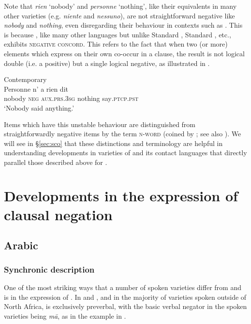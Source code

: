 \documentclass[output=paper]{langsci/langscibook}
\begin{document}
Note that  \textit{rien} ‘nobody’ and \textit{personne} ‘nothing’, like their equivalents in many other  varieties (e.g.  \textit{niente} and \textit{nessuno}), are not straightforward negative  like  \textit{nobody} and \textit{nothing}, even disregarding their behaviour in contexts such as . This is because , like many other languages but unlike {Standard} , {Standard} ,  etc., exhibits \textsc{negative} \textsc{concord}. This refers to the fact that when two (or more) elements which express  on their own co-occur in a clause, the result is not logical double  (i.e. a positive) but a single logical negative, as illustrated in .

\ea\label{cont2}
{       Contemporary  \citep[69]{Hansen2013}} \\
\gll Personne n’ a rien dit\\
     nobody \textsc{neg} \textsc{aux}.\textsc{prs.3sg} nothing say\textsc{.ptcp.pst}\\
\glt ‘Nobody said anything.’
\z

Items which have this unstable behaviour are distinguished from straightforwardly negative items by the term \textsc{n-word} (coined by \citealt{Laka1990}; see also \citealt{Giannakidou2006}). We will see in §\ref{sec:sco} that these distinctions and terminology are helpful in understanding developments in varieties of  and its contact languages that directly parallel those described above for .


\section{Developments in the expression of clausal negation}\label{sec:dev}


\subsection{Arabic}





\subsubsection{Synchronic description}



One of the most striking ways that a number of spoken  varieties differ from  and   is in the expression of . In  and  , and in the majority of varieties spoken outside of North Africa,  is exclusively preverbal, with the basic verbal negator in the spoken varieties being \textit{mā}, as in the   example in .
\end{document}
